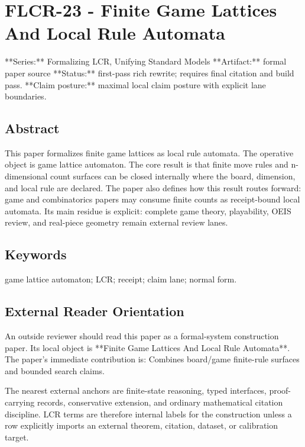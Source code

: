 \documentclass[11pt]{article}
\begin{document}
\section*{FLCR-23 - Finite Game Lattices And Local Rule Automata}

**Series:** Formalizing LCR, Unifying Standard Models
**Artifact:** formal paper source
**Status:** first-pass rich rewrite; requires final citation and build pass.
**Claim posture:** maximal local claim posture with explicit lane boundaries.

\subsection*{Abstract}

This paper formalizes finite game lattices as local rule automata. The operative object is game lattice automaton. The core result is that finite move rules and n-dimensional count surfaces can be closed internally where the board, dimension, and local rule are declared. The paper also defines how this result routes forward: game and combinatorics papers may consume finite counts as receipt-bound local automata. Its main residue is explicit: complete game theory, playability, OEIS review, and real-piece geometry remain external review lanes.

\subsection*{Keywords}

game lattice automaton; LCR; receipt; claim lane; normal form.

\subsection*{External Reader Orientation}

An outside reviewer should read this paper as a formal-system construction paper. Its local object is **Finite Game Lattices And Local Rule Automata**. The paper's immediate contribution is: Combines board/game finite-rule surfaces and bounded search claims.

The nearest external anchors are finite-state reasoning, typed interfaces, proof-carrying records, conservative extension, and ordinary mathematical citation discipline. LCR terms are therefore internal labels for the construction unless a row explicitly imports an external theorem, citation, dataset, or calibration target.
\end{document}
